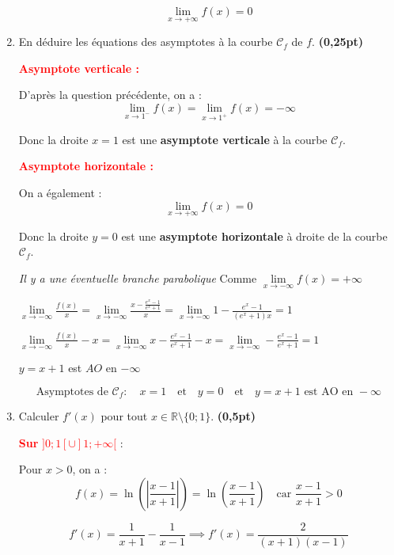 \documentclass[12pt,a4paper]{article}
\begin{document}
\begin{enumerate}
\begin{resultbox}
\[
\boxed{\lim_{x \to +\infty} f(x) = 0}
\]
\end{resultbox}

\item En déduire les équations des asymptotes à la courbe \( \mathscr{C}_f \) de \( f \). \hfill \textbf{(0,25pt)}

\textcolor{red}{\textbf{Asymptote verticale :}}

D’après la question précédente, on a :
\[
\lim_{x \to 1^-} f(x) = \lim_{x \to 1^+} f(x) = -\infty
\]

Donc la droite \( x = 1 \) est une \textbf{asymptote verticale} à la courbe \( \mathscr{C}_f \).

\vspace{0.5em}
\textcolor{red}{\textbf{Asymptote horizontale :}}

On a également :
\[
\lim_{x \to +\infty} f(x) = 0
\]

Donc la droite \( y = 0 \) est une \textbf{asymptote horizontale} à droite de la courbe \( \mathscr{C}_f \).

\textit{Il y a une éventuelle branche parabolique } Comme \( \lim\limits_{x\to -\infty} f(x)= +\infty \)

\( \lim\limits_{x\to -\infty} \frac{f(x)}{x} = \lim\limits_{x\to -\infty} \frac{x-\frac{e^x-1}{e^x +1}}{x}=\lim\limits_{x\to -\infty} 1-\frac{e^x-1}{(e^x +1)x} = 1\)

\( \lim\limits_{x\to -\infty} \frac{f(x)}{x} - x= \lim\limits_{x\to -\infty} x-\frac{e^x-1}{e^x +1}-x=\lim\limits_{x\to -\infty} -\frac{e^x-1}{e^x +1} = 1\)

\(y=x+1\) est \(AO\) en \(-\infty\)

\begin{resultbox}
\[
\boxed{
\text{Asymptotes de } \mathscr{C}_f :
\quad x = 1 \quad \text{et} \quad y = 0 \quad \text{et} \quad y=x+1 \text{ est AO en }  -\infty
}
\]
\end{resultbox}

\item Calculer \( f'(x) \) pour tout \( x \in \mathbb{R} \setminus \{0 ; 1\} \). \hfill \textbf{(0,5pt)}

\textcolor{red}{\textbf{Sur } \( ]0 ; 1[ \cup ]1 ; +\infty[ \)} :

Pour \( x > 0 \), on a :
\[
f(x) = \ln\left( \left| \frac{x - 1}{x + 1} \right| \right) = \ln\left( \frac{x - 1}{x + 1} \right) \quad \text{car } \frac{x - 1}{x + 1} > 0
\]

\[
f'(x) = \frac{1}{x+1} - \frac{1}{x-1}\implies  f'(x) =\frac{2}{(x + 1)(x - 1)}
\]


\end{enumerate}
\end{document}
